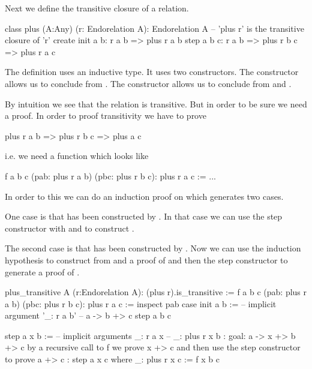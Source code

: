 Next we define the transitive closure of a relation.

\begin{alba}
  class
    plus (A:Any) (r: Endorelation A): Endorelation A
      -- 'plus r' is the transitive closure of 'r'
  create
    init a b:
      r a b
      => plus r a b
    step a b c:
      r a b
      => plus r b c
      => plus r a c
\end{alba}

The definition uses an inductive type. It uses two constructors. The
 constructor allows us to conclude  from .
The  constructor allows us to conclude  from
 and .

By intuition we see that the relation  is transitive. But in
order to be sure we need a proof. In order to proof transitivity we have to
prove
%
\begin{alba}
  plus r a b => plus r b c => plus a c
\end{alba}
%
i.e. we need a function which looks like
%
\begin{alba}
  f a b c (pab: plus r a b) (pbc: plus r b c): plus r a c :=
    ...
\end{alba}
%
In order to this we can do an induction proof on  which
generates two cases.

One case is that  has been constructed
by . In that case we can use the step constructor with
 and  to construct .

The second case is that   has been constructed by . Now we can use the induction
hypothesis to construct from  and  a proof of  and then the step constructor to generate a proof of .


\begin{alba}
  plus_transitive A (r:Endorelation A): (plus r).is_transitive :=
    f a b c (pab: plus r a b) (pbc: plus r b c): plus r a c :=
      inspect
        pab
      case
        init a b :=   -- implicit argument '_: r a b'
            -- a -> b +> c
          step a b c

        step a x b :=
            -- implicit arguments _:  r a x
            --                    _: plus r x b
            {: goal: a -> x +> b +> c
               by a recursive call to f we prove x +> c
               and then use the step constructor to prove a +> c :}
          step a x c
          where
             _: plus r x c := f x b c
\end{alba}



